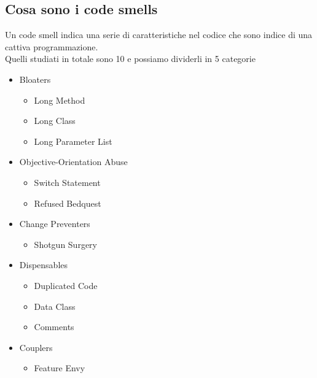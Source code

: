 \documentclass[12pt, a4paper, openany]{book}
\begin{document}
\subsection*{Cosa sono i code smells}
Un code smell indica una serie di caratteristiche nel codice che sono indice di una
cattiva programmazione.\\
Quelli studiati in totale sono 10 e possiamo dividerli in 5 categorie
\begin{itemize}
    \item Bloaters
    \begin{itemize}
        \item Long Method
        \item Long Class
        \item Long Parameter List
    \end{itemize}
    \item Objective-Orientation Abuse
    \begin{itemize}
        \item Switch Statement
        \item Refused Bedquest
    \end{itemize}
    \item Change Preventers
    \begin{itemize}
        \item Shotgun Surgery
    \end{itemize}
    \item Dispensables
    \begin{itemize}
        \item Duplicated Code
        \item Data Class
        \item Comments
    \end{itemize}
    \item Couplers
    \begin{itemize}
        \item Feature Envy
    \end{itemize}
\end{itemize}
\end{document}
